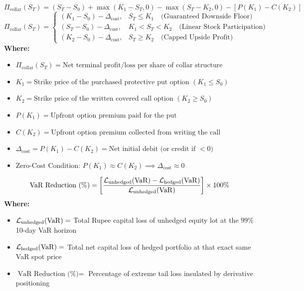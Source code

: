 \begin{formulabox}
\begin{equation*}
\Pi_{\text{collar}}(S_T) = (S_T - S_0) + \max(K_1 - S_T, 0) - \max(S_T - K_2, 0) - [P(K_1) - C(K_2)]
\end{equation*}
\begin{equation*}
\Pi_{\text{collar}}(S_T) = \begin{cases}
(K_1 - S_0) - \Delta_{\text{cost}}, & S_T \le K_1 \quad \text{(Guaranteed Downside Floor)} \\
(S_T - S_0) - \Delta_{\text{cost}}, & K_1 < S_T < K_2 \quad \text{(Linear Stock Participation)} \\
(K_2 - S_0) - \Delta_{\text{cost}}, & S_T \ge K_2 \quad \text{(Capped Upside Profit)}
\end{cases}
\end{equation*}
\textbf{Where:}
\begin{itemize}[leftmargin=1.8em, noitemsep]
    \item $\Pi_{\text{collar}}(S_T) = \text{Net terminal profit/loss per share of collar structure}$
    \item $K_1 = \text{Strike price of the purchased protective put option } (K_1 \le S_0)$
    \item $K_2 = \text{Strike price of the written covered call option } (K_2 \ge S_0)$
    \item $P(K_1) = \text{Upfront option premium paid for the put}$
    \item $C(K_2) = \text{Upfront option premium collected from writing the call}$
    \item $\Delta_{\text{cost}} = P(K_1) - C(K_2) = \text{Net initial debit (or credit if } < 0\text{)}$
    \item $\text{Zero-Cost Condition: } P(K_1) \approx C(K_2) \implies \Delta_{\text{cost}} \approx 0$
\end{itemize}
\end{formulabox}

\begin{formulabox}
\begin{equation*}
\text{VaR Reduction (\%)} = \left[ \frac{\mathcal{L}_{\text{unhedged}}(\operatorname{VaR}) - \mathcal{L}_{\text{hedged}}(\operatorname{VaR})}{\mathcal{L}_{\text{unhedged}}(\operatorname{VaR})} \right] \times 100\%
\end{equation*}
\textbf{Where:}
\begin{itemize}[leftmargin=1.8em, noitemsep]
    \item $\mathcal{L}_{\text{unhedged}}(\operatorname{VaR}) =$ Total Rupee capital loss of unhedged equity lot at the $99\%$ 10-day VaR horizon
    \item $\mathcal{L}_{\text{hedged}}(\operatorname{VaR}) =$ Total net capital loss of hedged portfolio at that exact same VaR spot price
    \item $\text{VaR Reduction (\%)} =$ Percentage of extreme tail loss insulated by derivative positioning
\end{itemize}
\end{formulabox}
